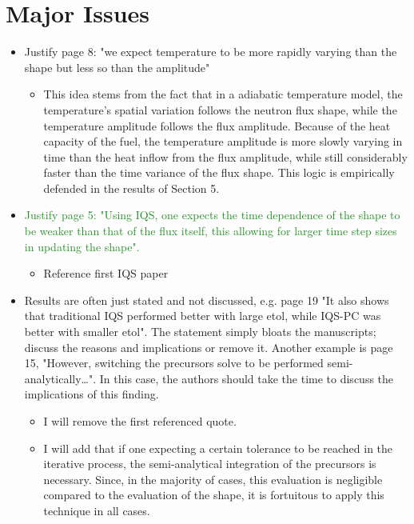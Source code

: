 \documentclass{elsarticle}
\newcommand{\fix}{\textsquare}
\newcommand{\done}{\checkmark}
\newcommand{\easy}[1]{\textcolor{ForestGreen}{#1}}
\newcommand{\medm}[1]{\textcolor{BurntOrange}{#1}}
\begin{document}
\section*{Major Issues}

\begin{itemize}

\item[\done] \medm{ Justify page 8: "we expect temperature to be more rapidly varying than the shape but less so than the amplitude" }
\begin{itemize}
\item This idea stems from the fact that in a adiabatic temperature model, the temperature's spatial variation follows the neutron flux shape, while the temperature amplitude follows the flux amplitude. Because of the heat capacity of the fuel, the temperature amplitude is more slowly varying in time than the heat inflow from the flux amplitude, while still considerably faster than the time variance of the flux shape. This logic is empirically defended in the results of Section 5.
\end{itemize}

\item[\done] \easy{ Justify page 5: "Using IQS, one expects the time dependence of the shape to be weaker than that of the flux itself, this allowing for larger time step sizes in updating the shape". }
\begin{itemize}
\item Reference first IQS paper
\end{itemize}

\item[\fix] \medm{  Results are often just stated and not discussed, e.g. page 19 "It also shows that traditional IQS performed better with large etol, while IQS-PC was better with smaller etol". The statement simply bloats the manuscripts; discuss the reasons and implications or remove it. Another example is page 15, "However, switching the precursors solve to be performed semi-analytically…".  In this case, the authors should take the time to discuss the implications of this finding. }
\begin{itemize}
\item I will remove the first referenced quote.
\item I will add that if one expecting a certain tolerance to be reached in the iterative process, the semi-analytical integration of the precursors is necessary. Since, in the majority of cases, this evaluation is negligible compared to the evaluation of the shape, it is fortuitous to apply this technique in all cases.
\end{itemize}


\end{itemize}
\end{document}
